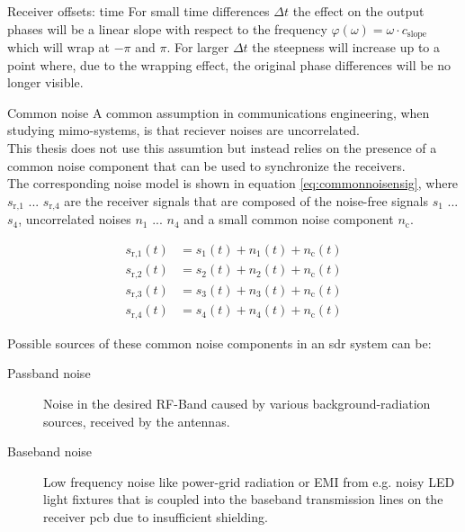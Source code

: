 \begin{subchapter}{Receiver offsets: time}
  For small time differences $\Delta t$ the effect on the output
  phases will be a linear slope with respect to the frequency
  $\varphi(\omega)= \omega \cdot c_\text{slope}$ which will wrap
  at $-\pi$ and $\pi$.
  For larger $\Delta t$ the steepness will increase up to a
  point where, due to the wrapping effect, the original phase
  differences will be no longer visible.
\end{subchapter}

\begin{subchapter}{Common noise}
  A common assumption in communications engineering, when
  studying \acrshort{mimo}-systems, is that reciever noises are
  uncorrelated. \\

  This thesis does not use this assumtion but instead
  relies on the presence of a common noise component
  that can be used to synchronize the receivers. \\

  The corresponding noise model is shown in equation
  \ref{eq:commonnoisensig}, where $s_\text{r,1}$ ... $s_\text{r,4}$
  are the receiver signals that are composed of
  the noise-free signals $s_\text{1}$ ... $s_\text{4}$,
  uncorrelated noises $n_\text{1}$ ... $n_\text{4}$
  and a small common noise component $n_\text{c}$.

  \begin{align}
    \label{eq:commonnoisensig}
    s_\text{r,1}(t) &= s_\text{1}(t) + n_\text{1}(t) + n_\text{c}(t) \\
    s_\text{r,2}(t) &= s_\text{2}(t) + n_\text{2}(t) + n_\text{c}(t) \nonumber \\
    s_\text{r,3}(t) &= s_\text{3}(t) + n_\text{3}(t) + n_\text{c}(t) \nonumber \\
    s_\text{r,4}(t) &= s_\text{4}(t) + n_\text{4}(t) + n_\text{c}(t) \nonumber
  \end{align}

  \noindent
  Possible sources of these common noise components in
  an \gls{sdr} system can be:

  \begin{description}
    \item[Passband noise]
      Noise in the desired RF-Band caused by various background-radiation
      sources, received by the antennas.

    \item[Baseband noise]
      Low frequency noise like power-grid radiation or EMI from e.g.
      noisy LED light fixtures that is coupled into the baseband transmission
      lines on the receiver \acrshort{pcb} due to insufficient shielding.


\end{description}
\end{subchapter}
